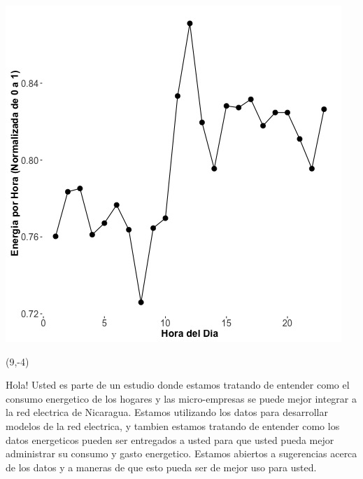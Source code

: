 \documentclass{article}\usepackage[]{graphicx}\usepackage[]{color}
\newenvironment{knitrout}{}{} %
\begin{document}
\begin{knitrout}
\color{fgcolor}
\includegraphics[scale=0.75]{figure/A7_fplot_norm_median} 
\end{knitrout}

\begin{textblock}{1}(9,-4)
\begin{minipage}{20em}
\begingroup

\endgroup
\end{minipage}
\end{textblock}

\vspace{70px}
\begin{knitrout}
Hola! Usted es parte de un estudio donde estamos tratando de entender como el consumo energetico de los hogares y las micro-empresas se puede mejor integrar a la red electrica de Nicaragua. Estamos utilizando los datos para desarrollar modelos de la red electrica, y tambien estamos tratando de entender como los datos energeticos pueden ser entregados a usted para que usted pueda mejor administrar su consumo y gasto energetico.  Estamos abiertos a sugerencias acerca de los datos y a maneras de que esto pueda ser de mejor uso para usted.
\end{knitrout}
\end{document}
